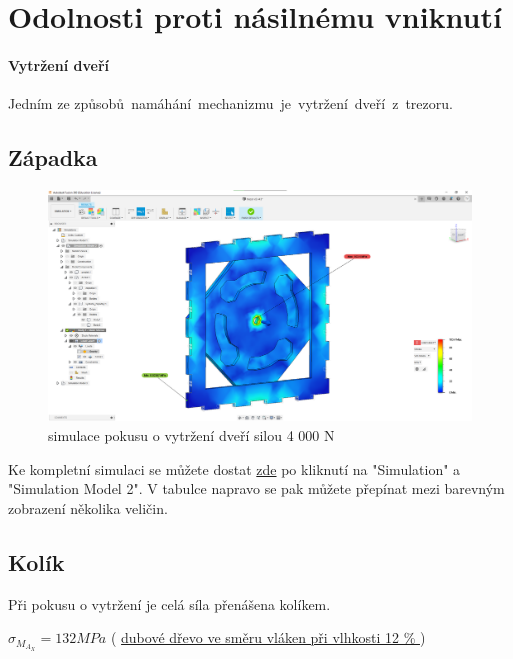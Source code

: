 \section{Odolnosti proti násilnému vniknutí}

\paragraph{Vytržení dveří}
Jedním ze způsobů~namáhání~mechanizmu~je~vytržení~dveří~z~trezoru.

\subsection{Západka}

\begin{figure}[htbp]
    \centering
    \includegraphics[width=\textwidth]{kapitoly/obrazky/M3/simulace/odolnost_proti_vytrzeni_4kN.png}
    \caption{simulace pokusu o vytržení dveří silou 4 000 N}
    \label{fig:M3-simulace-vytrzeni}
\end{figure}
Ke kompletní simulaci se můžete dostat \href{https://myhub.autodesk360.com/ue2d7aa41/g/shares/SH56a43QTfd62c1cd96843f1e03a0eb48053?viewState=NoIgbgDAdAjCA0IDeAdEAXAngBwKZoC40BlASwFsBXAGwEN1SB7AOzXjVoGdPd1C0ARjABsATlEQItALQBjcbmkAWCMIjSBuWgA5lAM22ilAVgAmMAOyy9%2BBGkYCAVrlnoAkqcIBmAL4gAukA}{zde}
po kliknutí na "Simulation" a "Simulation Model 2". V tabulce napravo se pak můžete přepínat mezi barevným zobrazení několika veličin.

\newpage

\subsection{Kolík}
Při pokusu o vytržení je celá síla přenášena kolíkem.

\(\sigma _M_A_X = 132 MPa\)    ( \href{https://is.mendelu.cz/eknihovna/opory/zobraz_cast.pl?fit_w=1;cast=9190}{dubové dřevo ve směru vláken při vlhkosti 12 \% }) %

